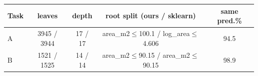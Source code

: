 \begin{tabular}{@{}lcccc@{}}
\toprule
Task & leaves & depth & root split (ours / sklearn) & same pred.\% \\
\midrule
A & 3945 / 3944 & 17 / 17 & area\_m2$\le$100.1 / log\_area$\le$4.606 & 94.5 \\
B & 1521 / 1525 & 14 / 14 & area\_m2$\le$90.15 / area\_m2$\le$90.15 & 98.9 \\
\bottomrule
\end{tabular}
